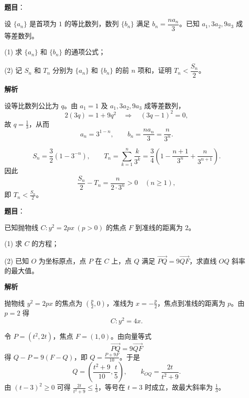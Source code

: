 \begin{answer}

\textbf{题目}：

设 $\{a_n\}$ 是首项为 $1$ 的等比数列，数列 $\{b_n\}$ 满足 $b_n=\dfrac{na_n}{3}$。已知 $a_1,3a_2,9a_3$ 成等差数列。

(1) 求 $\{a_n\}$ 和 $\{b_n\}$ 的通项公式；

(2) 记 $S_n$ 和 $T_n$ 分别为 $\{a_n\}$ 和 $\{b_n\}$ 的前 $n$ 项和，证明 $T_n<\dfrac{S_n}{2}$。

\Needspace{0.4\textheight}

\textbf{解析}


设等比数列公比为 $q$。由 $a_1=1$ 及 $a_1,3a_2,9a_3$ 成等差数列，
\nopagebreak[4]
\[
2(3q)=1+9q^2\quad\Longrightarrow\quad(3q-1)^2=0,
\]
故 $q=\frac13$，从而
\nopagebreak[4]
\[
a_n=3^{1-n},\qquad b_n=\frac{na_n}{3}=\frac{n}{3^n}.
\]


\nopagebreak[4]
\[
S_n=\frac32(1-3^{-n}),\qquad
T_n=\sum_{k=1}^n\frac{k}{3^k}
=\frac34\left(1-\frac{n+1}{3^n}+\frac{n}{3^{n+1}}\right).
\]
因此
\nopagebreak[4]
\[
\frac{S_n}{2}-T_n
=\frac{n}{2\cdot3^n}>0\quad(n\geqslant1),
\]
即 $T_n<\frac{S_n}{2}$。



\end{answer}
\begin{answer}

\textbf{题目}：

已知抛物线 $C:y^2=2px\ (p>0)$ 的焦点 $F$ 到准线的距离为 $2$。

(1) 求 $C$ 的方程；

(2) 已知 $O$ 为坐标原点，点 $P$ 在 $C$ 上，点 $Q$ 满足 $\overrightarrow{PQ}=9\overrightarrow{QF}$，求直线 $OQ$ 斜率的最大值。

\textbf{解析}


抛物线 $y^2=2px$ 的焦点为 $(\frac p2,0)$，准线为 $x=-\frac p2$，焦点到准线的距离为 $p$。由 $p=2$ 得
\nopagebreak[4]
\[
C:y^2=4x.
\]


令 $P=(t^2,2t)$，焦点 $F=(1,0)$。由向量等式
\nopagebreak[4]
\[
\overrightarrow{PQ}=9\overrightarrow{QF}
\]
得 $Q-P=9(F-Q)$，即 $Q=\frac{P+9F}{10}$。于是
\nopagebreak[4]
\[
Q=\left(\frac{t^2+9}{10},\frac t5\right),\qquad
k_{OQ}=\frac{2t}{t^2+9}.
\]
由 $(t-3)^2\geqslant0$ 可得 $\frac{2t}{t^2+9}\leqslant\frac13$，等号在 $t=3$ 时成立，故最大斜率为 $\frac13$。



\end{answer}

